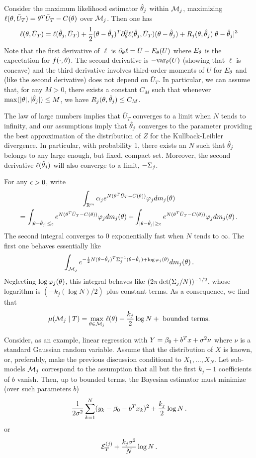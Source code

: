 Consider the maximum likelihood estimator $\hat {\theta}_j$ within  ${\mathcal M}_j$, maximizing $\ell(\theta, \bar U_T) = \theta^T \bar U_T - C(\theta)$ over ${\mathcal M}_j$. Then one has
\[
\ell(\theta, \bar U_T) = \ell(\hat{\theta}_j, \bar U_T) + \frac12 (\theta - \hat {\theta}_j)^T \partial^2_\theta\ell({\hat{\theta}}_j, \bar U_T)(\theta-{\hat{\theta}}_j) + R_j(\theta, {\hat{\theta}}_j) |\theta-{\hat{\theta}}_j|^3
\]
Note that the first derivative of $\ell$ is $\partial_\theta \ell  = \bar U - E_\theta(U)$ where $E_\theta$ is the expectation for $f(\cdot, \theta)$. The second derivative is $-\mathrm{var}_\theta(U)$ (showing that $\ell$ is concave) and the third derivative involves third-order moments of $U$ for $E_\theta$ and (like the second derivative) does not depend on $\bar U_T$. In particular, we can assume that, for any $M>0$, there exists a constant $C_M$ such  that whenever $\max(|\theta|, |{\hat{\theta}}_j|) \leq M$, we have $R_j(\theta, {\hat{\theta}}_j) \leq C_M$.

The law of large numbers implies that $\bar U_T$ converges to a limit when $N$ tends to infinity, and our assumptions imply that ${\hat{\theta}}_j$ converges to the parameter providing the best approximation of the distribution of $Z$ for the Kullback-Leibler divergence. In particular, with probability 1, there exists an $N$ such that ${\hat{\theta}}_j$ belongs to any large enough, but fixed, compact set. Moreover, the second derivative $\ell({\hat{\theta}}_j)$ will also converge to a limit, $-\Sigma_j$. 

For any $\epsilon>0$, write
\begin{multline*}
\int_{{\mathbb{R}}^m} \alpha_j e^{N(\theta^T \bar U_T - C(\theta))} \varphi_j dm_j(\theta) \\
= \int_{|\theta - {\hat{\theta}}_j| \leq \epsilon} e^{N(\theta^T \bar U_T - C(\theta))} \varphi_j dm_j(\theta) + \int_{|\theta - {\hat{\theta}}_j| \geq \epsilon} e^{N(\theta^T \bar U_T - C(\theta))} \varphi_j dm_j(\theta)\,.
\end{multline*}
The second integral  converges to $0$ exponentially fast when $N$ tends to $\infty$. The first one  behaves essentially like 
\[
\int_{{\mathcal M}_j} e^{- \frac12 N (\theta - \hat {\theta}_j)^T \Sigma_j^{-1} (\theta - \hat {\theta}_j) + \log\varphi_j(\theta)} dm_j(\theta)\,.
\]
Neglecting $\log\varphi_j(\theta)$, this integral behaves like $(2\pi\det (\Sigma_j/N))^{-1/2}$, whose logarithm is $(-k_j(\log N)/2)$ plus constant terms. As a consequence, we find that 
\[
\mu({\mathcal M}_j\mid T) = \max_{\theta\in {\mathcal M}_j} \ell(\theta) - \frac {k_j}2 \log N + \text{ bounded terms}.
\]


Consider, as an example, linear regression  with $Y = \beta_0 + b^T x + \sigma^2 \nu$ where $\nu$ is a standard Gaussian random variable. Assume that the distribution of $X$ is known, or, preferably, make the previous discussion conditional to $X_1, \ldots, X_N$. 
Let sub-models ${\mathcal M}_j$ correspond to the assumption that all but the first $k_j-1$ coefficients of $b$ vanish. 
Then, up to bounded terms, the Bayesian estimator must minimize (over such parameters $b$)
\[
\frac1{2\sigma^2} \sum_{k=1}^N (y_k - \beta_0 - b^T x_k)^2 + \frac {k_j} 2 \log N\,.
\]
or
\[
{\mathcal E}^{(j)}_T + \frac{k_j\sigma^2}N \log N\,.
\]


